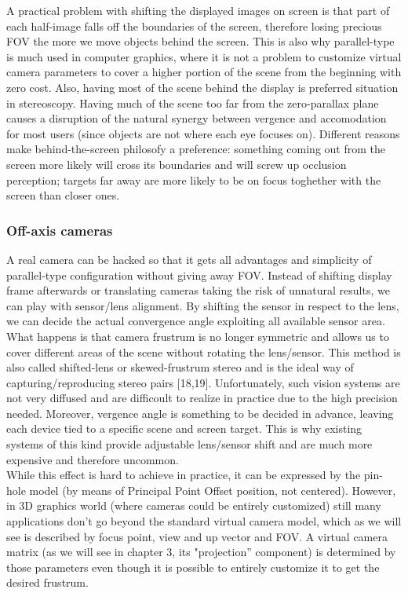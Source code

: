 A practical problem with shifting the displayed images on screen is that part of each half-image falls off the boundaries of the screen, therefore losing precious FOV the more we move objects behind the screen. This is also why parallel-type is much used in computer graphics, where it is not a problem to customize virtual camera parameters to cover a higher portion of the scene from the beginning with zero cost. Also, having most of the scene behind the display is preferred situation in stereoscopy. Having much of the scene too far from the zero-parallax plane causes a disruption of the natural synergy between vergence and accomodation for most users (since objects are not where each eye focuses on). Different reasons make behind-the-screen philosofy a preference: something coming out from the screen more likely will cross its boundaries and will screw up occlusion perception; targets far away are more likely to be on focus toghether with the screen than closer ones.

\subsubsection{Off-axis cameras}
A real camera can be hacked so that it gets all advantages and simplicity of parallel-type configuration without giving away FOV. Instead of shifting display frame afterwards or translating cameras taking the risk of unnatural results, we can play with sensor/lens alignment. By shifting the sensor in respect to the lens, we can decide the actual convergence angle exploiting all available sensor area. What happens is that camera frustrum is no longer symmetric and allows us to cover different areas of the scene without rotating the lens/sensor. This method is also called shifted-lens or skewed-frustrum stereo and is the ideal way of capturing/reproducing stereo pairs [18,19]. Unfortunately, such vision systems are not very diffused and are difficoult to realize in practice due to the high precision needed. Moreover, vergence angle is something to be decided in advance, leaving each device tied to a specific scene and screen target. This is why existing systems of this kind provide adjustable lens/sensor shift and are much more expensive and therefore uncommon.\\
While this effect is hard to achieve in practice, it can be expressed by the pin-hole model (by means of Principal Point Offset position, not centered). However, in 3D graphics world (where cameras could be entirely customized) still many applications don’t go beyond the standard virtual camera model, which as we will see is described by focus point, view and up vector and FOV. A virtual camera matrix (as we will see in chapter 3, its "projection” component) is determined by those parameters even though it is possible to entirely customize it to get the desired frustrum.

